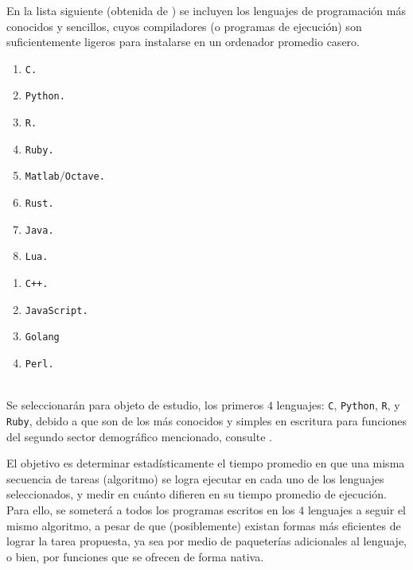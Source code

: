\documentclass[11pt,a4paper]{article}
\begin{document}
En la lista siguiente (obtenida de ) se incluyen los lenguajes de programación más conocidos y sencillos, cuyos compiladores (o programas de ejecución) son suficientemente ligeros para instalarse en un ordenador promedio casero.\\
\begin{minipage}{0.33\linewidth}
\begin{enumerate}[noitemsep]
	\item \texttt{C.}
	\item \texttt{Python.}
	\item \texttt{R.}
	\item \texttt{Ruby.}
\end{enumerate}
\end{minipage}\hspace{5mm}
\begin{minipage}{0.33\linewidth}
	\begin{enumerate}[noitemsep]
	\setcounter{enumi}{4}
	\item \texttt{Matlab\(/\)Octave.}
	\item \texttt{Rust.}
	\item \texttt{Java.}
	\item \texttt{Lua.}
	\end{enumerate}
\end{minipage} \hspace{5mm}
\begin{minipage}{0.33\linewidth}
	\begin{enumerate}[noitemsep]
		\item \texttt{C++.}
		\item \texttt{JavaScript.}
		\item \texttt{Golang}
		\item \texttt{Perl.}
	\end{enumerate}
\end{minipage}\\[2mm]
Se seleccionarán para objeto de estudio, los primeros \(4\) lenguajes: \texttt{C}, \texttt{Python}, \texttt{R}, y \texttt{Ruby}, debido a que son de los más conocidos y simples en escritura para funciones del segundo sector demográfico mencionado, consulte .

El objetivo es determinar estadísticamente el tiempo promedio en que una misma secuencia de tareas (algoritmo) se logra ejecutar en cada uno de los lenguajes seleccionados, y medir en cuánto difieren en su tiempo promedio de ejecución.
Para ello, se someterá a todos los programas escritos en los \(4\) lenguajes a seguir el mismo algoritmo, a pesar de que (posiblemente) existan formas más eficientes de lograr la tarea propuesta, ya sea por medio de paqueterías adicionales al lenguaje, o bien, por funciones que se ofrecen de forma nativa.
\end{document}
